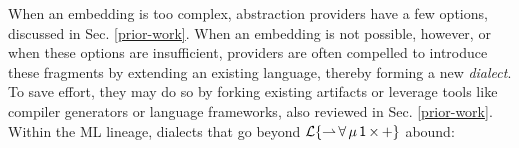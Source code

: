 \documentclass{llncs}
\begin{document}
When an embedding is too complex, abstraction providers have a few options, discussed in Sec. \ref{prior-work}. When an embedding is not possible, however, or when these options are  insufficient, providers are often compelled to introduce these fragments by extending an existing language, thereby forming a new \emph{dialect}. To save effort, they may do so by forking existing artifacts or leverage tools like compiler generators or language frameworks, also reviewed in Sec. \ref{prior-work}. %
Within the ML lineage, dialects that go  beyond $\mathcal{L}\{{\rightharpoonup}\,{\forall}\,{\mu}\,{{\sf 1}}\,{\times}\,{+}\}$ abound:
%
\end{document}
